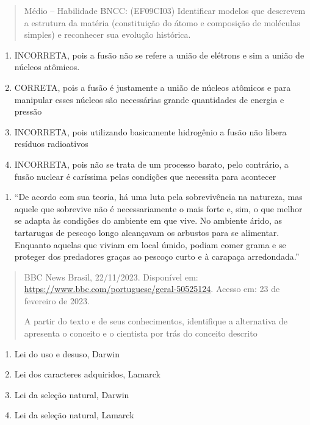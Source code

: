 \begin{quote}
Médio -- Habilidade BNCC: (EF09CI03) Identificar modelos que descrevem a
estrutura da matéria (constituição do átomo e composição de moléculas
simples) e reconhecer sua evolução histórica.
\end{quote}

\begin{enumerate}
\def\labelenumi{(\Alph{enumi})}
\item
  INCORRETA, pois a fusão não se refere a união de elétrons e sim a
  união de núcleos atômicos.
\item
  CORRETA, pois a fusão é justamente a união de núcleos atômicos e para
  manipular esses núcleos são necessárias grande quantidades de energia
  e pressão
\item
  INCORRETA, pois utilizando basicamente hidrogênio a fusão não libera
  resíduos radioativos
\item
  INCORRETA, pois não se trata de um processo barato, pelo contrário, a
  fusão nuclear é caríssima pelas condições que necessita para acontecer
\end{enumerate}

\begin{enumerate}
\def\labelenumi{\arabic{enumi})}
\item
  ``De acordo com sua teoria, há uma luta pela sobrevivência na
  natureza, mas aquele que sobrevive não é necessariamente o mais forte
  e, sim, o que melhor se adapta às condições do ambiente em que vive.
  No ambiente árido, as tartarugas de pescoço longo alcançavam os
  arbustos para se alimentar. Enquanto aquelas que viviam em local
  úmido, podiam comer grama e se proteger dos predadores graças ao
  pescoço curto e à carapaça arredondada.''
\end{enumerate}

\begin{quote}
BBC News Brasil, 22/11/2023. Disponível em:
\url{https://www.bbc.com/portuguese/geral-50525124}. Acesso em: 23 de
fevereiro de 2023.

A partir do texto e de seus conhecimentos, identifique a alternativa de
apresenta o conceito e o cientista por trás do conceito descrito
\end{quote}

\begin{enumerate}
\def\labelenumi{(\Alph{enumi})}
\item
  Lei do uso e desuso, Darwin
\item
  Lei dos caracteres adquiridos, Lamarck
\item
  Lei da seleção natural, Darwin
\item
  Lei da seleção natural, Lamarck
\end{enumerate}

